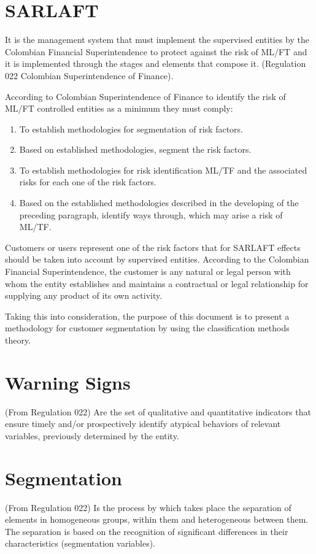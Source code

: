 \section{SARLAFT}
It is the management system that must implement the supervised entities by the Colombian Financial Superintendence to protect against the risk of ML/FT and it is implemented through the stages and elements that compose it. (Regulation 022 Colombian Superintendence of Finance).\par
According to Colombian Superintendence of Finance to identify the risk of ML/FT controlled entities as a minimum they must comply:
\begin{enumerate}
  \item To establish methodologies for segmentation of risk factors.
  \item Based on established methodologies, segment the risk factors.
  \item To establish methodologies for risk identification ML/TF and the associated risks for each one of the risk factors.
\item Based on the established methodologies described in the developing of the preceding paragraph, identify ways through, which may arise a risk of ML/TF.
\end{enumerate}
Customers or users represent one of the risk factors that for SARLAFT effects should be taken into account by supervised entities.
According to the Colombian Financial Superintendence, the customer is any natural or legal person with whom the entity establishes and maintains a contractual or legal relationship for supplying any product of its own activity.\par
Taking this into consideration, the purpose of this document is to present a methodology for customer segmentation by using the classification methods theory.

\section{Warning Signs} (From Regulation 022)
Are the set of qualitative and quantitative indicators that ensure timely and/or prospectively identify atypical behaviors of relevant variables, previously determined by the entity.
\section{Segmentation} (From Regulation 022)
Is the process by which takes place the separation of elements in homogeneous groups, within them and heterogeneous between them. The separation is based on the recognition of significant differences in their characteristics (segmentation variables).

\clearemptydoublepage
